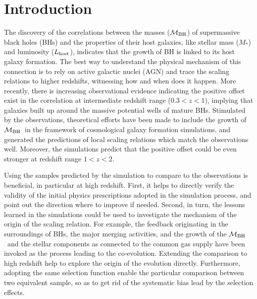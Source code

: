 \documentclass{natureprintstyle}
\newcommand{\mbh}{$\mathcal M_{\rm BH}$}
\newcommand{\lhost}{$L_{\rm host}$}
\newcommand{\mstar}{{$M_*$}}
\begin{document}
\section{Introduction}
The discovery of the correlations between the masses (\mbh) of supermassive black holes (BHs) and the properties of their host galaxies, like stellar mass (\mstar) and luminosity (\lhost), indicates that the growth of BH is linked to its host galaxy formation. The best way to understand the physical mechanism of this connection is to rely on active galactic nuclei (AGN) and trace the scaling relations to higher redshifts, witnessing how and when does it happen. More recently, there is increasing observational evidence indicating the positive offset exist in the correlation at intermediate redshift range ($0.3<z<1$), implying that galaxies built up around the massive potential wells of mature BHs. Stimulated by the observations, theoretical efforts have been made to include the growth of \mbh\ in the framework of cosmological galaxy formation simulations, and generated the predictions of local scaling relations which match the observations well. Moreover, the simulations predict that the positive offset could be even stronger at redshift range $1<z<2$. 

Using the samples predicted by the simulation to compare to the observations is beneficial, in particular at high redshift. First, it helps to directly verify the validity of the initial physics prescriptions adopted in the simulation process, and point out the direction where to improve if needed. Second, in turn, the lessons learned in the simulations could be used to investigate the mechanism of the origin of the scaling relation. For example, the feedback originating in the surroundings of BHs, the major merging activities, and the growth of the \mbh\ and the stellar components as connected to the common gas supply have been invoked as the process leading to the co-evolution. Extending the comparison to high redshift help to explore the origin of the evolution directly. Furthermore, adopting the same selection function enable the particular comparison between two equivalent sample, so as to get rid of the systematic bias lead by the selection effects.
\end{document}
